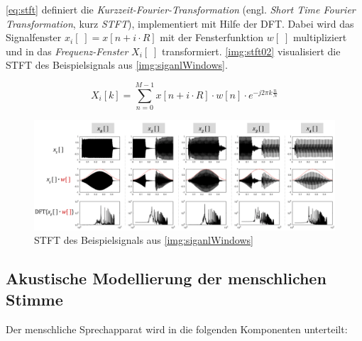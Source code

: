 \autoref{eq:stft} definiert die \emph{Kurzzeit-Fourier-Transformation} (engl. \emph{Short Time Fourier Transformation}, kurz \emph{STFT}), implementiert mit Hilfe der DFT. Dabei wird das Signalfenster $x_i[\;] = x[n+i\cdot R]$ mit der Fensterfunktion $w[\;]$ multipliziert und in das \emph{Frequenz-Fenster} $X_i[\;]$ transformiert.\cite[S. 69]{sprachverarbeitung} \cite{stft} \autoref{img:stft02} visualisiert die STFT des Beispielsignals aus \autoref{img:siganlWindows}.

\begin{equation}
X_i[k] = \sum_{n=0}^{M-1} x[n+i\cdot R] \cdot w[n] \cdot e^{-j 2\pi k \frac{n}{N}}
\label{eq:stft}
\end{equation}

\begin{figure}[h]
	\centering
	\includegraphics[width=1\textwidth]{bilder/signalWindows03.png}
	\caption{STFT des Beispielsignals aus \autoref{img:siganlWindows}}
	\label{img:stft02}
\end{figure}


\subsection{Akustische Modellierung der menschlichen Stimme}
\label{sec:theVoice}

Der menschliche Sprechapparat wird in die folgenden Komponenten unterteilt:

